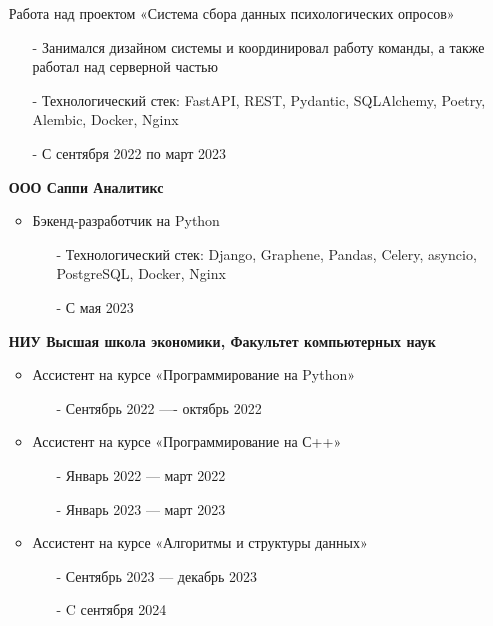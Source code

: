 \documentclass[10pt,a4paper]{altacv}
\begin{document}
\begin{itemize}

\item[] Работа над проектом «Система сбора данных психологических опросов» 
\begin{itemize}
    \item[-] Занимался дизайном системы и координировал работу команды, а также работал над серверной частью
    \item[-] Технологический стек: FastAPI, REST, Pydantic, SQLAlchemy, Poetry, Alembic, Docker, Nginx
    \item[-] С сентября 2022 по март 2023
\end{itemize}

\item[] \textbf{ООО Саппи Аналитикс}
\begin{itemize}
    \item Бэкенд-разработчик на Python
    \begin{itemize}
        \item[-] Технологический стек: Django, Graphene, Pandas, Celery, asyncio, PostgreSQL, Docker, Nginx
        \item[-] С мая 2023
    \end{itemize}
\end{itemize}

\item[] \textbf{НИУ Высшая школа экономики, Факультет компьютерных наук}
\begin{itemize}
    \item Ассистент на курсе «Программирование на Python»
    \begin{itemize}
        \item[-] Сентябрь 2022 ---- октябрь 2022
    \end{itemize}
    \item Ассистент на курсе «Программирование на С++»
    \begin{itemize}
        \item[-] Январь 2022 --- март 2022
        \item[-] Январь 2023 --- март 2023
    \end{itemize}
    \item Ассистент на курсе «Алгоритмы и структуры данных»
    \begin{itemize}
        \item[-] Сентябрь 2023 --- декабрь 2023
        \item[-] C сентября 2024
    \end{itemize}
\end{itemize}


\end{itemize}
\end{document}

